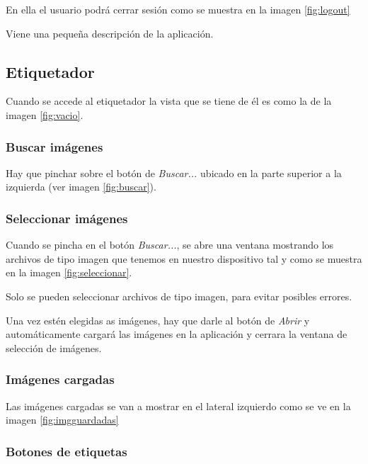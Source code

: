 En ella el usuario podrá cerrar sesión como se muestra en la imagen \ref{fig:logout}

Viene una pequeña descripción de la aplicación.


\subsection{Etiquetador}
Cuando se accede al etiquetador la vista que se tiene de él es como la de la imagen \ref{fig:vacio}.

\subsubsection{Buscar imágenes}
Hay que pinchar sobre el botón de \textit{Buscar...} ubicado en la parte superior a la izquierda (ver imagen \ref{fig:buscar}).

\subsubsection{Seleccionar imágenes}
Cuando se pincha en el botón \textit{Buscar...}, se abre una ventana mostrando los archivos de tipo imagen que tenemos en nuestro dispositivo tal y como se muestra en la imagen \ref{fig:seleccionar}. 

Solo se pueden seleccionar archivos de tipo imagen, para evitar posibles errores.

Una vez estén elegidas as imágenes, hay que darle al botón de \textit{Abrir} y automáticamente cargará las imágenes en la aplicación y cerrara la ventana de selección de imágenes.
\subsubsection{Imágenes cargadas}
Las imágenes cargadas se van a mostrar en el lateral izquierdo como se ve en la imagen \ref{fig:imgguardadas}
\subsubsection{Botones de etiquetas}

